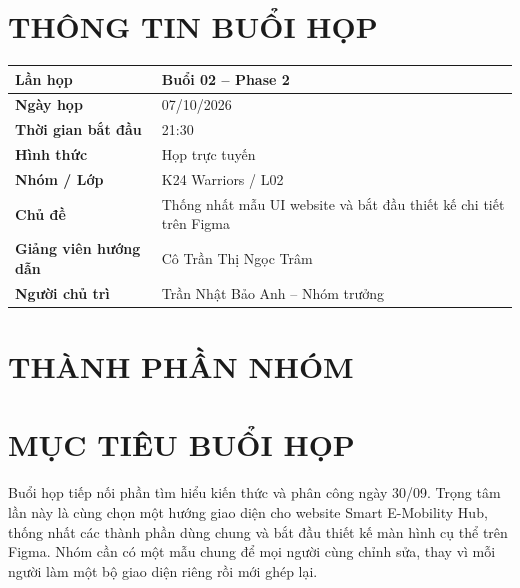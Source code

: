 \documentclass[10pt,a4paper]{article}
\begin{document}
\MakeHCMUTCover

\section{THÔNG TIN BUỔI HỌP}
\begin{center}
\begin{tabularx}{\textwidth}{|>{\bfseries}L{43mm}|Y|}
  \hline
  Lần họp & Buổi 02 -- Phase 2\\\hline
  Ngày họp & 07/10/2026\\\hline
  Thời gian bắt đầu & 21:30\\\hline
  Hình thức & Họp trực tuyến\\\hline
  Nhóm / Lớp & K24 Warriors / L02\\\hline
  Chủ đề & Thống nhất mẫu UI website và bắt đầu thiết kế chi tiết trên Figma\\\hline
  Giảng viên hướng dẫn & Cô Trần Thị Ngọc Trâm\\\hline
  Người chủ trì & Trần Nhật Bảo Anh -- Nhóm trưởng\\\hline
\end{tabularx}
\end{center}

\section{THÀNH PHẦN NHÓM}
\begin{HCMUTMemberTable}
\end{HCMUTMemberTable}

\section{MỤC TIÊU BUỔI HỌP}
Buổi họp tiếp nối phần tìm hiểu kiến thức và phân công ngày 30/09. Trọng tâm lần này là cùng chọn một hướng giao diện cho website Smart E-Mobility Hub, thống nhất các thành phần dùng chung và bắt đầu thiết kế màn hình cụ thể trên Figma. Nhóm cần có một mẫu chung để mọi người cùng chỉnh sửa, thay vì mỗi người làm một bộ giao diện riêng rồi mới ghép lại.
\end{document}
